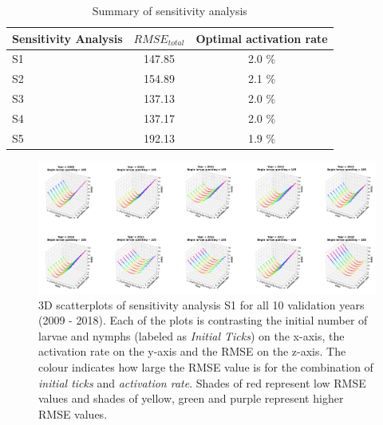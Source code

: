\documentclass[a4paper, 11pt]{scrartcl}
\begin{document}
\begin{table}[h!]
\caption{Summary of sensitivity analysis}
\label{tab:summary}
\begin{tabularx}{\textwidth}{lcc}
\toprule
\textbf{Sensitivity Analysis} & \textbf{$RMSE_{total}$} & \textbf{Optimal activation rate} \\
\midrule
S1 & 147.85 & 2.0 \% \\
S2 & 154.89 & 2.1 \% \\
S3 & 137.13 & 2.0 \% \\
S4 & 137.17 & 2.0 \% \\
S5 & 192.13 & 1.9 \% \\
\bottomrule
\end{tabularx}
\end{table}



\printbibliography[heading = bibintoc, title = {Bibliography}]


\newpage

\begin{figure}
\centering
\includegraphics[width=\linewidth]{figures/initial_ticks_with_beech_error.png}
\caption{3D scatterplots of sensitivity analysis S1 for all 10 validation years (2009 - 2018). Each of the plots is contrasting the initial number of larvae and nymphs
(labeled as \textit{Initial Ticks}) on the x-axis, the activation rate on the y-axis and the RMSE on the z-axis. The colour indicates how large the RMSE value is for the
combination of \textit{initial ticks} and \textit{activation rate}. Shades of red represent low RMSE values and shades of yellow, green and purple represent higher RMSE values.}
\label{fig:initial_ticks_with_beech_error_rotated}
\end{figure}
\end{document}
